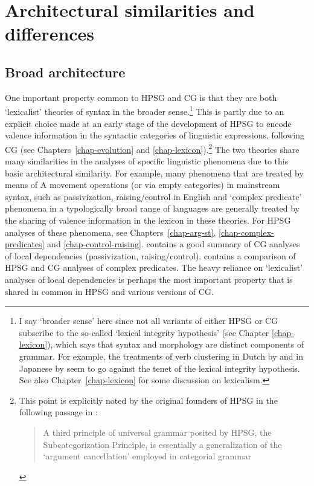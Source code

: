 \documentclass[output=paper]{langsci/langscibook}
\begin{document}
\section{Architectural similarities and differences}

\subsection{Broad architecture}

One important property common to HPSG and CG is that they are both
`lexicalist' theories of syntax in the broader sense.\footnote{I say
`broader sense' here since not all variants of either HPSG or CG subscribe to the
so-called `lexical integrity hypothesis' (see Chapter
\ref{chap-lexicon}), which says that syntax and 
morphology are distinct components of grammar. For example,
the treatments of verb clustering in Dutch by \citet{moortgatoehrle94} and
in Japanese by \citet{Kubota2014a-u} seem to go against the tenet of
the lexical integrity hypothesis. See also Chapter~\ref{chap-lexicon} for some discussion
on lexicalism.} 
This is partly due to an explicit choice made at an early
stage of the development of HPSG to encode valence information in the
syntactic categories of linguistic expressions, following CG
(see Chapters~\ref{chap-evolution} and \ref{chap-lexicon}).\footnote{This
  point is explicitly noted by the original founders of HPSG
  in the following passage in \citet[11]{ps}:

\begin{quote}
A third principle of universal grammar posited by HPSG, the
Subcategorization Principle, is essentially a generalization of the
`argument cancellation' employed in categorial grammar
\end{quote}

}
The two theories share many similarities in the
analyses of specific linguistic phenomena due to this basic
architectural similarity. For example, many phenomena that are treated
by means of A movement operations (or via empty categories) in
mainstream syntax, such as passivization, raising/control in English
and `complex predicate' phenomena in a typologically broad range of
languages are generally treated by the sharing of valence information
in the lexicon in these theories. For HPSG
analyses of these phenomena, see Chapters~\ref{chap-arg-st},
\ref{chap-complex-predicates} and \ref{chap-control-raising}.
\citet{steedman2011ccg} contains a good
summary of CG analyses of local dependencies 
(passivization, raising/control). \citet{Kubota2014a-u} contains
a comparison of HPSG and CG analyses of complex predicates.
The heavy reliance on `lexicalist' analyses of
local dependencies 
is perhaps the most important property that is shared in common in
HPSG and various versions of CG.
\end{document}

